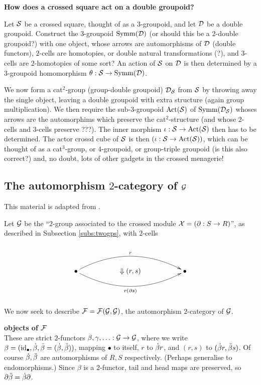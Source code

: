 \bigskip\noindent 
{\bf How does a crossed square act on a double groupoid?} 

Let $\mathcal{S}$ be a crossed square, thought of as a $3$-groupoid, 
and let $\mathcal{D}$ be a double groupoid. 
Construct the $3$-groupoid $\mathrm{Symm}(\mathcal{D})$ 
(or should this be a $2$-double groupoid?)
with one object, whose arrows are automorphisms of $\mathcal{D}$ (double functors), 
$2$-cells are homotopies, or double natural transformations (?), 
and $3$-cells are $2$-homotopies of some sort? 
An action of $\mathcal{S}$ on $\mathcal{D}$ is then determined by a 
$3$-groupoid homomorphism $\theta : \mathcal{S} \to \mathrm{Symm}(\mathcal{D})$.

We now form a cat$^2$-group (group-double groupoid) 
$\mathcal{D}_{\mathcal{S}}$ from $\mathcal{S}$ by throwing away the single object, 
leaving a double groupoid with extra structure (again group multiplication).
We then require the sub-$3$-groupoid $\mathrm{Act}(\mathcal{S})$ 
of $\mathrm{Symm}(\mathcal{D}_{\mathcal{S}})$ whoses arrows 
are the automorphims which preserve the cat$^2$-structure 
(and whose $2$-cells and $3$-cells preserve ???). 
The inner morphism $\iota : \mathcal{S} \to \mathrm{Act}(\mathcal{S})$ then has to be determined.  
The actor crossd cube of $\mathcal{S}$ is then 
$(\iota : \mathcal{S} \to \mathrm{Act}(\mathcal{S}))$, 
which can be thought of as a cat$^3$-group, 
or $4$-groupoid, or group-triple groupoid (is this also correct?) 
and, no doubt, lots of other gadgets in the crossed menagerie!


\newpage
\subsection{The automorphism $2$-category of $\mathcal{G}$}

This material is adapted from \cite{kamps:port}.

Let $\mathcal{G}$ be the ``$2$-group associated to the crossed module 
$\mathcal{X} = (\partial : S \to R)$'', 
as described in Subsection \ref{subs:twogps}, 
with $2$-cells

$$
\xy
\xymatrix{
  && && \\
  \bullet  \ar@/^5ex/[rrrr]^{r} 
           \ar@/_5ex/[rrrr]_{r(\partial s)} 
  && \Downarrow (r,s)
     && \bullet \\
  && && \\
}
\endxy
$$

\medskip\noindent
We now seek to describe $\mathcal{F} = \mathcal{F}(\mathcal{G},\mathcal{G})$, 
the automorphism $2$-category of $\mathcal{G}$.

\medskip\noindent
{\large{\bf objects of $\mathcal{F}$}}\\ 
These are strict $2$-functors $\beta,\gamma,\ldots : \mathcal{G} \to \mathcal{G}$, 
where we write $\beta = (\mathrm{id}_{\bullet},\dot{\beta}, \bar{\beta}=(\dot{\beta},\ddot{\beta}))$, 
mapping $\bullet$ to itself, $r$ to $\dot{\beta} r$, 
and $(r,s)$ to $(\dot{\beta} r, \ddot{\beta} s)$. 
Of course $\dot{\beta},\ddot{\beta}$ are automorphisms of $R,S$ respectively. 
(Perhaps generalise to endomorphisms.)
Since $\beta$ is a $2$-functor, tail and head maps are preserved, 
so $\partial\ddot{\beta} = \dot{\beta}\partial$.

